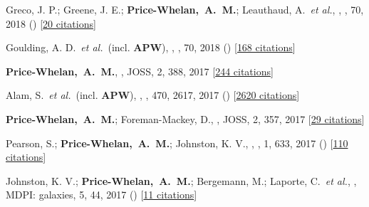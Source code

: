 {\item[{\color{deemph}\scriptsize34}]Greco, J. P.; Greene, J. E.; \textbf{Price-Whelan,~A.~M.}; Leauthaud, A.~\textit{et al.}, , \pasj, 70, 2018 () [\href{http://adsabs.harvard.edu/abs/2018PASJ...70S..19G}{20 citations}]

\item[{\color{deemph}\scriptsize33}]Goulding, A. D.~\textit{et al.}~(incl. \textbf{APW}), , \pasj, 70, 2018 () [\href{http://adsabs.harvard.edu/abs/2018PASJ...70S..37G}{168 citations}]

\item[{\color{deemph}\scriptsize32}]\textbf{Price-Whelan,~A.~M.}, , JOSS, 2, 388, 2017 [\href{http://adsabs.harvard.edu/abs/2017JOSS....2..388P}{244 citations}]

\item[{\color{deemph}\scriptsize31}]Alam, S.~\textit{et al.}~(incl. \textbf{APW}), , \mnras, 470, 2617, 2017 () [\href{http://adsabs.harvard.edu/abs/2017MNRAS.470.2617A}{2620 citations}]

\item[{\color{deemph}\scriptsize30}]\textbf{Price-Whelan,~A.~M.}; Foreman-Mackey, D., , JOSS, 2, 357, 2017 [\href{http://adsabs.harvard.edu/abs/2017JOSS....2..357P}{29 citations}]

\item[{\color{deemph}\scriptsize29}]Pearson, S.; \textbf{Price-Whelan,~A.~M.}; Johnston, K. V., , \natureast, 1, 633, 2017 () [\href{http://adsabs.harvard.edu/abs/2017NatAs...1..633P}{110 citations}]

\item[{\color{deemph}\scriptsize28}]Johnston, K. V.; \textbf{Price-Whelan,~A.~M.}; Bergemann, M.; Laporte, C.~\textit{et al.}, , MDPI: galaxies, 5, 44, 2017 () [\href{http://adsabs.harvard.edu/abs/2017Galax...5...44J}{11 citations}]

}
